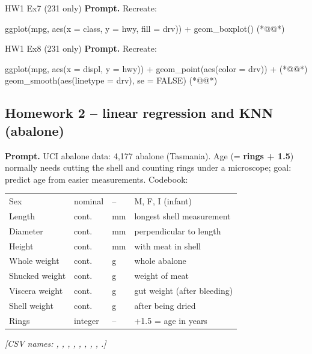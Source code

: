 \begin{qbox}{HW1 Ex7 (231 only)}
\textbf{Prompt.} Recreate:
\ans
\begin{rcode}
ggplot(mpg, aes(x = class, y = hwy, fill = drv)) + geom_boxplot()  (*@@*)
\end{rcode}
\end{qbox}

\begin{qbox}{HW1 Ex8 (231 only)}
\textbf{Prompt.} Recreate:
\ans
\begin{rcode}
ggplot(mpg, aes(x = displ, y = hwy)) +
  geom_point(aes(color = drv)) +  (*@@*)
  geom_smooth(aes(linetype = drv), se = FALSE)  (*@@*)
\end{rcode}
\end{qbox}

\subsection{Homework 2 -- linear regression and KNN (abalone)}
%
\textbf{Prompt.} UCI abalone data: 4{,}177 abalone (Tasmania). Age (= \textbf{rings + 1.5}) normally needs cutting the shell and counting rings under a microscope; goal: predict age from easier measurements. Codebook:
{\footnotesize
\begin{tabular}{@{}l l l l@{}}
\toprule
Sex & nominal & -- & M, F, I (infant)\\
Length & cont. & mm & longest shell measurement\\
Diameter & cont. & mm & perpendicular to length\\
Height & cont. & mm & with meat in shell\\
Whole weight & cont. & g & whole abalone\\
Shucked weight & cont. & g & weight of meat\\
Viscera weight & cont. & g & gut weight (after bleeding)\\
Shell weight & cont. & g & after being dried\\
Rings & integer & -- & +1.5 = age in years\\
\bottomrule
\end{tabular}}
{\color{figgray}\itshape [CSV names: , , , , , , , , .]}

